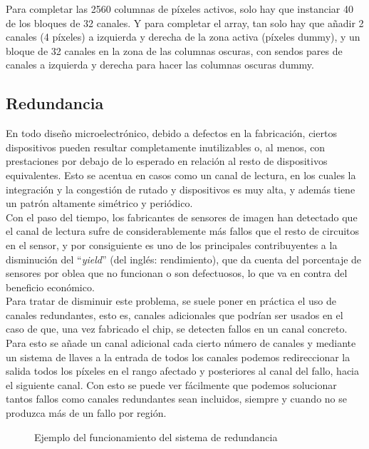 Para completar las 2560 columnas de píxeles activos, solo hay que instanciar 40
de los bloques de 32 canales. Y para completar el array, tan solo hay que añadir
2 canales (4 píxeles) a izquierda y derecha de la zona activa (píxeles dummy), y
un bloque de 32 canales en la zona de las columnas oscuras, con sendos pares de
canales a izquierda y derecha para hacer las columnas oscuras dummy.\\

\subsection{Redundancia}

En todo diseño microelectrónico, debido a defectos en la fabricación, ciertos
dispositivos pueden resultar completamente inutilizables o, al menos, con prestaciones
por debajo de lo esperado en relación al resto de dispositivos equivalentes.
Esto se acentua en casos como un canal de lectura, en los cuales la integración
y la congestión de rutado y dispositivos es muy alta, y además tiene un patrón
altamente simétrico y periódico.\\

Con el paso del tiempo, los fabricantes de sensores de imagen han detectado que
el canal de lectura sufre de considerablemente más fallos que el resto de circuitos
en el sensor, y por consiguiente es uno de los principales contribuyentes a la
disminución del ``\textit{yield}'' (del inglés: rendimiento), que da cuenta del
porcentaje de sensores por oblea que no funcionan o son defectuosos, lo que va
en contra del beneficio económico.\\

Para tratar de disminuir este problema, se suele poner en práctica el uso de canales
redundantes, esto es, canales adicionales que podrían ser usados en el caso de que,
una vez fabricado el chip, se detecten fallos en un canal concreto.\\

Para esto se añade un canal adicional cada cierto número de canales y mediante un
sistema de llaves a la entrada de todos los canales podemos redireccionar la
salida todos los píxeles en el rango afectado y posteriores al canal del fallo,
hacia el siguiente canal. Con esto se puede ver fácilmente que podemos solucionar
tantos fallos como canales redundantes sean incluidos, siempre y cuando no se
produzca más de un fallo por región.\\

\begin{figure}[h]
	
	\caption{Ejemplo del funcionamiento del sistema de redundancia}
	\label{fig:redundancy}
\end{figure}

